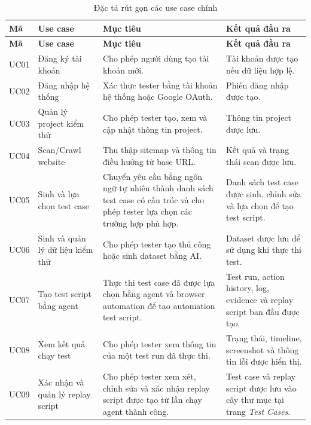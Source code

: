 {\small
\begin{longtable}{|p{1.4cm}|p{3.6cm}|p{5.5cm}|p{3.8cm}|}
\caption{Đặc tả rút gọn các use case chính}
\label{tab:main_use_cases} \\
\hline
\textbf{Mã} &
\textbf{Use case} &
\textbf{Mục tiêu} &
\textbf{Kết quả đầu ra} \\
\hline
\endfirsthead

\hline
\textbf{Mã} &
\textbf{Use case} &
\textbf{Mục tiêu} &
\textbf{Kết quả đầu ra} \\
\hline
\endhead

UC01 &
Đăng ký tài khoản &
Cho phép người dùng tạo tài khoản mới. &
Tài khoản được tạo nếu dữ liệu hợp lệ. \\
\hline

UC02 &
Đăng nhập hệ thống &
Xác thực tester bằng tài khoản hệ thống hoặc Google OAuth. &
Phiên đăng nhập được tạo. \\
\hline

UC03 &
Quản lý project kiểm thử &
Cho phép tester tạo, xem và cập nhật thông tin project. &
Thông tin project được lưu. \\
\hline

UC04 &
Scan/Crawl website &
Thu thập sitemap và thông tin điều hướng từ base URL. &
Kết quả và trạng thái scan được lưu. \\
\hline

UC05 &
Sinh và lựa chọn test case &
Chuyển yêu cầu bằng ngôn ngữ tự nhiên thành danh sách test case có cấu trúc và cho phép tester lựa chọn các trường hợp phù hợp. &
Danh sách test case được sinh, chỉnh sửa và lựa chọn để tạo test script. \\
\hline

UC06 &
Sinh và quản lý dữ liệu kiểm thử &
Cho phép tester tạo thủ công hoặc sinh dataset bằng AI. &
Dataset được lưu để sử dụng khi thực thi test. \\
\hline

UC07 &
Tạo test script bằng agent &
Thực thi test case đã được lựa chọn bằng agent và browser automation để tạo automation test script. &
Test run, action history, log, evidence và replay script ban đầu được tạo. \\
\hline

UC08 &
Xem kết quả chạy test &
Cho phép tester xem thông tin của một test run đã thực thi. &
Trạng thái, timeline, screenshot và thông tin lỗi được hiển thị. \\
\hline

UC09 &
Xác nhận và quản lý replay script &
Cho phép tester xem xét, chỉnh sửa và xác nhận replay script được tạo từ lần chạy agent thành công. &
Test case và replay script được lưu vào cây thư mục tại trang \textit{Test Cases}. \\
\hline


\end{longtable}}
